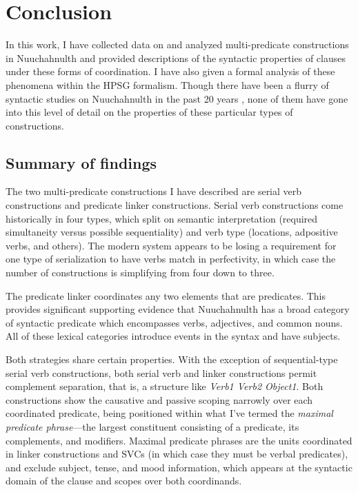 \chapter{Conclusion} \label{ch:conclusion}

In this work, I have collected data on and analyzed multi-predicate constructions in Nuuchahnulth and provided descriptions of the syntactic properties of clauses under these forms of coordination. I have also given a formal analysis of these phenomena within the HPSG formalism. Though there have been a flurry of syntactic studies on Nuuchahnulth in the past 20 years \citep{nakayama2001, davidson2002, waldie2004, wojdak2005, woo2007b, waldie2012}, none of them have gone into this level of detail on the properties of these particular types of constructions.

\section{Summary of findings}

The two multi-predicate constructions I have described are serial verb constructions and predicate linker constructions. Serial verb constructions come historically in four types, which split on semantic interpretation (required simultaneity versus possible sequentiality) and verb type (locations, adpositive verbs, and others). The modern system appears to be losing a requirement for one type of serialization to have verbs match in perfectivity, in which case the number of constructions is simplifying from four down to three.

The predicate linker coordinates any two elements that are predicates. This provides significant supporting evidence that Nuuchahnulth has a broad category of syntactic predicate which encompasses verbs, adjectives, and common nouns. All of these lexical categories introduce events in the syntax and have subjects.

Both strategies share certain properties. With the exception of 	sequential-type serial verb constructions, both serial verb and linker constructions permit complement separation, that is, a structure like \textit{Verb1 Verb2 Object1}. Both constructions show the causative and passive scoping narrowly over each coordinated predicate, being positioned within what I've termed the \textit{maximal predicate phrase}---the largest constituent consisting of a predicate, its complements, and modifiers. Maximal predicate phrases are the units coordinated in linker constructions and SVCs (in which case they must be verbal predicates), and exclude subject, tense, and mood information, which appears at the syntactic domain of the clause and scopes over both coordinands.

